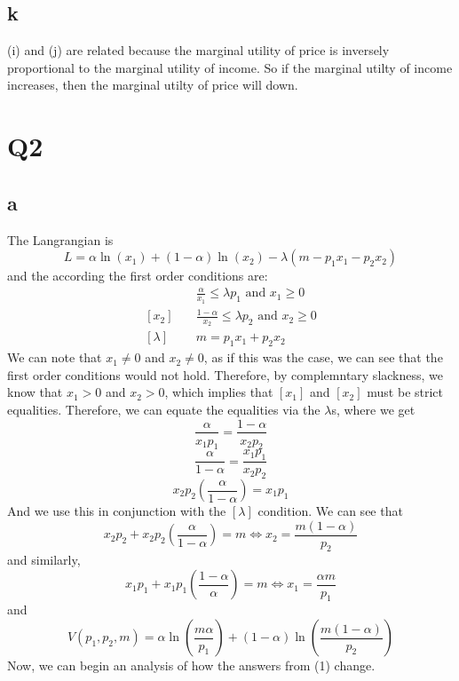 \documentclass[12pt]{article}
\begin{document}
\subsection*{k}
(i) and (j) are related because the marginal utility of price is inversely proportional to the marginal utility of income. So if the marginal utilty of income increases, then the marginal utilty of price will down. 
\section*{Q2}
\subsection*{a}
The Langrangian is 
\[
L = \alpha \ln(x_1) + (1-\alpha) \ln(x_2) - \lambda(m-p_1x_1 - p_2x_2)
\]
and the according the first order conditions are:
\begin{align*}
    [x_1] & \quad \frac{\alpha}{x_1} \leq \lambda p_1 \text{ and } x_1 \geq 0\\
    [x_2] & \quad \frac{1-\alpha}{x_2} \leq \lambda p_2 \text{ and } x_2 \geq 0\\
    [\lambda] & \quad m = p_1 x_1 + p_2 x_2
\end{align*}
We can note that $x_1 \neq 0$ and $x_2 \neq 0$, as if this was the case, we can see that the first order conditions would not hold. Therefore, by complemntary slackness, we know that $x_1 > 0$ and $x_2 > 0$, which implies that $[x_1]$ and $[x_2]$ must be strict equalities. Therefore, we can equate the equalities via the $\lambda$s, where we get 
\[
\frac{\alpha}{x_1 p_1} = \frac{1-\alpha}{x_2 p_2}
\]
\[
\frac{\alpha}{1-\alpha} = \frac{x_1 p_1}{x_2p_2}
\]
\[
x_2p_2 \left( \frac{\alpha}{1-\alpha} \right) = x_1p_1
\]
And we use this in conjunction with the $[\lambda]$ condition. We can see that 
\[
x_2 p_2 + x_2p_2 \left( \frac{\alpha}{1-\alpha} \right) = m \iff x_2 = \frac{m (1-\alpha)}{p_2}
\]
and similarly, 
\[
x_1p_1 + x_1p_1 \left( \frac{1-\alpha}{\alpha} \right) = m \iff x_1 = \frac{\alpha m }{p_1}
\]
and 
\[
V(p_1, p_2, m) = \alpha \ln\left(\frac{m \alpha}{p_1}\right) + (1-\alpha) \ln\left(\frac{m(1-\alpha)}{p_2}\right)
\]
Now, we can begin an analysis of how the answers from (1) change.  
\end{document}
